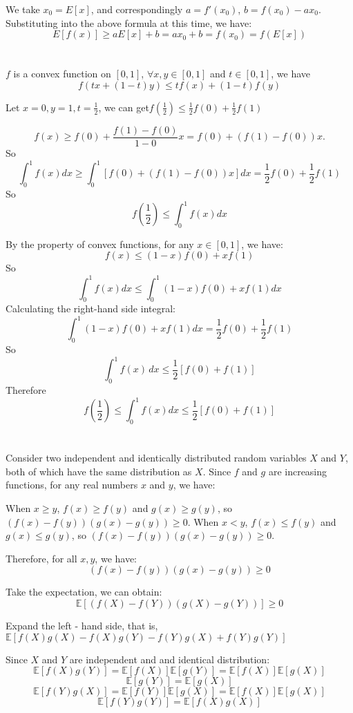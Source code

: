 \documentclass{article}
\begin{document}
We take $ x_0 = E[x] $, and correspondingly $ a = f'(x_0) $, $ b = f(x_0)-ax_0 $. Substituting into the above formula at this time, we have:
$$
E[f(x)]\geq aE[x]+b = ax_0 + b = f(x_0)=f(E[x])
$$

\section{}
$f$ is a convex function on $[0,1]$, $\forall x,y \in [0,1]$ and $t\in[0,1]$, we have
$$
f(tx+(1-t)y)\leq tf(x)+(1-t)f(y)
$$

Let $x=0, y=1, t=\frac{1}{2}$, we can get$f(\frac{1}{2})\leq \frac{1}{2}f(0)+\frac{1}{2}f(1)$

$$
f(x) \geq f(0) + \frac{f(1) - f(0)}{1-0} x = f(0) + (f(1) - f(0)) x.
$$
So
$$
\int_{0}^{1} f(x) dx \geq \int_{0}^{1} \left[ f(0) + (f(1) - f(0)) x \right] dx =\frac{1}{2}f(0)+\frac{1}{2}f(1)
$$
So
$$
f(\frac{1}{2}) \leq \int_{0}^{1} f(x) dx
$$

By the property of convex functions, for any $x \in [0, 1]$, we have:
$$
f(x) \leq (1-x) f(0) + x f(1)
$$
So
$$
\int_{0}^{1} f(x) dx \leq \int_{0}^{1} (1-x) f(0) + x f(1)  dx
$$
Calculating the right-hand side integral:
$$
	\int_{0}^{1} (1-x) f(0) + x f(1)  dx =\frac{1}{2}f(0)+\frac{1}{2}f(1)
$$
So
$$
\int_{0}^{1} f(x) \, dx \leq \frac{1}{2} [f(0) + f(1)]
$$
Therefore
$$
f(\frac{1}{2}) \leq \int_{0}^{1} f(x) dx \leq \frac{1}{2} [f(0) + f(1)]
$$

\section{}

Consider two independent and identically distributed random variables $ X $ and $ Y $, both of which have the same distribution as $ X $. Since $ f $ and $ g $ are increasing functions, for any real numbers $ x $ and $ y $, we have:

When $ x \geq y $, $ f(x) \geq f(y) $ and $ g(x) \geq g(y) $, so $ (f(x) - f(y))(g(x) - g(y)) \geq 0 $.
When $ x < y $, $ f(x) \leq f(y) $ and $ g(x) \leq g(y) $, so $ (f(x) - f(y))(g(x) - g(y)) \geq 0 $.

Therefore, for all $ x, y $, we have:
$$
(f(x) - f(y))(g(x) - g(y)) \geq 0
$$

Take the expectation, we can obtain:
$$
\mathbb{E}[(f(X) - f(Y))(g(X) - g(Y))] \geq 0
$$

Expand the left - hand side, that is, 
$\mathbb{E}[f(X)g(X)-f(X)g(Y)-f(Y)g(X)+f(Y)g(Y)]$

Since $ X $ and $ Y $ are independent and and identical distribution:
$$
\mathbb{E}[f(X)g(Y)]=\mathbb{E}[f(X)]\mathbb{E}[g(Y)]=\mathbb{E}[f(X)]\mathbb{E}[g(X)]
$$
$$\mathbb{E}[g(Y)] = \mathbb{E}[g(X)]
$$
$$
\mathbb{E}[f(Y)g(X)]=\mathbb{E}[f(Y)]\mathbb{E}[g(X)]=\mathbb{E}[f(X)]\mathbb{E}[g(X)]
$$
$$
\mathbb{E}[f(Y)g(Y)]=\mathbb{E}[f(X)g(X)]
$$ 
\end{document}
